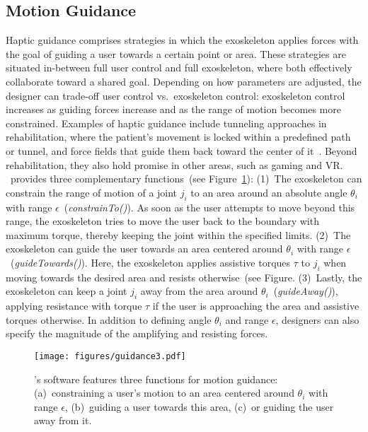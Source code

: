 \subsection{Motion Guidance}
Haptic guidance comprises strategies in which the exoskeleton applies forces with the goal of guiding a user towards a certain point or area. These strategies are situated in-between full user control and full exoskeleton, where both effectively collaborate toward a shared goal. Depending on how parameters are adjusted, the designer can trade-off user control vs.~exoskeleton control: exoskeleton control increases as guiding forces increase and as the range of motion becomes more constrained.
Examples of haptic guidance include tunneling approaches in rehabilitation, where the patient’s movement is locked within a predefined path or tunnel, and force fields that guide them back toward the center of it~\cite{guidali_2011,proietti_2016,gasperina_2021}. Beyond rehabilitation, they also hold promise in other areas, such as gaming and VR. 
\toolkit~provides three complementary functions~(see Figure~\ref{fig:guidance}):
(1)~The exoskeleton can constrain the range of motion of a joint $j_i$ to an area around an absolute angle $\theta_{i}$ with range $\epsilon$~(\textit{constrainTo()}). As soon as the user attempts to move beyond this range, the exoskeleton tries to move the user back to the boundary with maximum torque, thereby keeping the joint within the specified limits. 
(2)~The exoskeleton can guide the user towards an area centered around $\theta_i$ with range $\epsilon$~(\textit{guideTowards()}). Here, the exoskeleton applies assistive torques $\tau$ to $j_i$ when moving towards the desired area and resists otherwise~(see Figure. (3)~Lastly, the exoskeleton can keep a joint $j_i$ away from the area around $\theta_{i}$~(\textit{guideAway()}), applying resistance with torque $\tau$ if the user is approaching the area and assistive torques otherwise. In addition to defining angle $\theta_{i}$ and range $\epsilon$, designers can also specify the magnitude of the amplifying and resisting forces.

\begin{figure}[bt]
    \centering
    \texttt{[image: figures/guidance3.pdf]}
    \caption{\toolkit's software features three functions for motion guidance: (a)~constraining a user's motion to an area centered around $\theta_i$ with range $\epsilon$, (b)~guiding a user towards this area, (c)~or guiding the user away from it.}
    \label{fig:guidance}
\end{figure}

